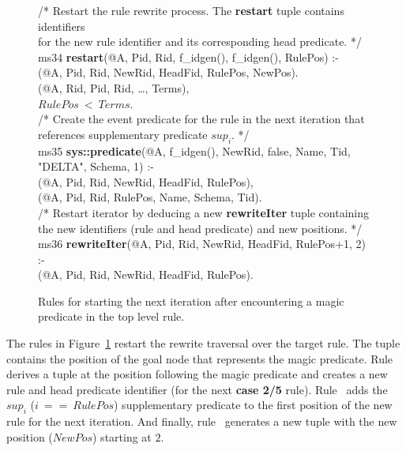 \begin{figure}[!t]
\ssp
\centering
\begin{boxedminipage}{\linewidth}
/* Restart the rule rewrite process. The {\bf restart} tuple contains identifiers  \\
for the new rule identifier and its corresponding head predicate. */ \\
ms34 {\bf restart}(@A, Pid, Rid, f\_idgen(), f\_idgen(), RulePos) :- \\
(@A, Pid, Rid, NewRid, HeadFid, RulePos, NewPos). \\
(@A, Rid, Pid, Rid, \ldots, Terms), \\
\datalogspace $RulePos\ <\ Terms$. \\
	
/* Create the event predicate for the rule in the next iteration that  \\
references supplementary predicate $sup_i$. */ \\
ms35 {\bf sys::predicate}(@A, f\_idgen(), NewRid, false, Name, Tid, "DELTA", Schema, 1) :- \\
(@A, Pid, Rid, NewRid, HeadFid, RulePos), \\
(@A, Pid, Rid, RulePos, Name, Schema, Tid). \\
	
/* Restart iterator by deducing a new {\bf rewriteIter} tuple containing \\
the new identifiers (rule and head predicate) and new positions. */ \\
ms36 {\bf rewriteIter}(@A, Pid, Rid, NewRid, HeadFid, RulePos+1, 2) :- \\
(@A, Pid, Rid, NewRid, HeadFid, RulePos).

\end{boxedminipage}
\caption{\label{ch:magic:fig:rewrite8}Rules for starting the next iteration after
encountering a magic predicate in the top level rule. }
\end{figure}

The rules in Figure~\ref{ch:magic:fig:rewrite8} restart the rewrite traversal
over the target rule.  The  tuple contains the position of the goal
node that represents the magic predicate.  Rule~ derives a
 tuple at the position following the magic predicate and creates a
new rule and head predicate identifier (for the next {\bf case 2/5} rule).
Rule~ adds the $sup_i$ ($i\ ==\ RulePos$) supplementary predicate to
the first position of the new rule for the next iteration.  And finally,
rule~ generates a new  tuple with the new position
($NewPos$) starting at $2$.

